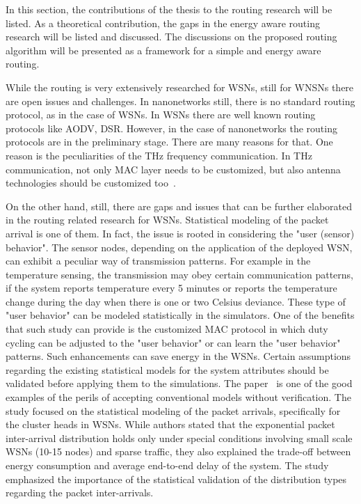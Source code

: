 \documentclass[12pt, oneandhalf, chaparabic, sees, ms]{metu}
\begin{document}
In this section, the contributions of the thesis to the routing research will be listed. As a theoretical contribution,
the gaps in the energy aware routing research will be listed and discussed. The discussions on the proposed routing algorithm
will be presented as a framework for a simple and energy aware routing.

While the routing is very extensively researched for WSNs, still for WNSNs there are open issues and challenges.
In nanonetworks still, there is no standard routing protocol, as in the case of WSNs. In WSNs there are well known 
routing protocols like AODV, DSR. However, in the case of nanonetworks the routing protocols are in the preliminary stage.
There are many reasons for that. One reason is the peculiarities of the THz frequency communication. In THz communication, 
not only MAC layer needs to be customized, but also antenna technologies should be customized too~\cite{akyildiz2014}. 

On the other hand, still, there are gaps and issues that can be further elaborated in the routing related research for WSNs.
Statistical modeling of the packet arrival is one of them. In fact, the issue is rooted in considering the "user (sensor) behavior". 
The sensor nodes, depending on the application of the deployed WSN, can exhibit a peculiar way of transmission patterns. For example
in the temperature sensing, the transmission may obey certain communication patterns,
if the system reports temperature every 5 minutes or reports the temperature change during the day when there is one or two Celsius
deviance. These type of "user behavior" can be modeled statistically in the simulators. One of the benefits that such study can provide
is the customized MAC protocol in which duty cycling can be adjusted to the "user behavior" or can learn the "user behavior" patterns.
Such enhancements can save energy in the WSNs. Certain assumptions regarding the existing statistical models for the system attributes 
should be validated before applying them to the simulations.
The paper~\cite{doddapaneni2015} is one of the good examples of the perils of accepting conventional models without verification.
The study focused on the statistical modeling of the packet arrivals, specifically for the cluster heads in WSNs. 
While authors stated that the exponential packet inter-arrival distribution holds only under special conditions 
involving small scale WSNs (10-15 nodes) and sparse traffic, they also explained the trade-off between energy consumption and average 
end-to-end delay of the system. The study emphasized the importance of the statistical validation of the distribution types regarding 
the packet inter-arrivals.
\end{document}
